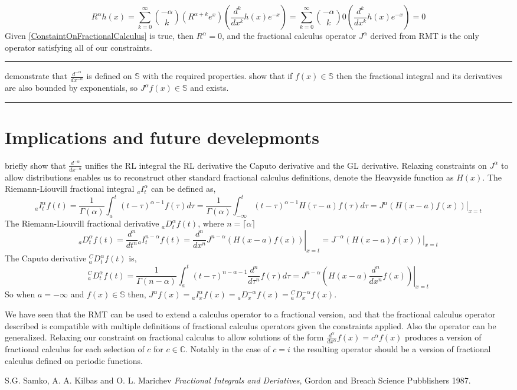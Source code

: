 \documentclass[%
 preprint,
 amsmath, amssymb, aps, pra, 10pt
]{revtex4-2}
\begin{document}
\[R^\alpha h(x) = \sum_{k=0}^\infty \binom{-\alpha}{k}\left( R^{\alpha + k}e^x \right)\left( \frac{d^k}{dx^k} h(x)e^{-x}\right) = \sum_{k=0}^\infty \binom{-\alpha}{k} 0 \left( \frac{d^k}{dx^k} h(x)e^{-x}\right) = 0\]
Given \eqref{ConstaintOnFractionalCalculus} is true, then $R^\alpha = 0$, and the fractional calculus operator $J^\alpha$ derived from RMT is the only operator satisfying all of our constraints.

\noindent\rule{\textwidth}{1pt}
demonstrate that $\frac{d^{-\alpha}}{dx^{-\alpha}}$ is defined on $\mathbb{S}$ with the required properties. show that if $f(x) \in \mathbb{S}$ then the fractional integral and its derivatives are also bounded by exponentials, so $J^\alpha f(x) \in \mathbb{S}$ and exists.

\noindent\rule{\textwidth}{1pt}

\section{Implications and future develepmonts}
briefly show that $\frac{d^{-\alpha}}{dx^{-\alpha}}$ unifies the RL integral the RL derivative the Caputo derivative and the GL derivative. Relaxing constraints on $J^\alpha$ to allow distributions enables us to reconstruct other standard fractional calculus definitions, denote the Heavyside function as $H(x)$. The Riemann-Liouvill fractional integral ${}_aI_t^\alpha$ can be defined as,
\[{}_aI_t^\alpha f(t) = \frac{1}{\Gamma(\alpha)}\int_a^t (t - \tau)^{\alpha - 1}f(\tau)d\tau = \frac{1}{\Gamma(\alpha)}\int_{-\infty}^t (t - \tau)^{\alpha - 1}H(\tau - a)f(\tau)d\tau = \left. J^\alpha \left(H(x - a)f(x)\right)\right|_{x = t}\]
The Riemann-Liouvill fractional derivative ${}_aD_t^\alpha f(t)$, where $n = \lceil \alpha \rceil$
\[{}_aD_t^\alpha f(t) = \frac{d^n}{dt^n} {}_aI_t^{n - \alpha} f(t) = \left. \frac{d^n}{dx^n} J^{n - \alpha} \left(H(x - a)f(x)\right)\right|_{x = t} = \left. J^{-\alpha} \left(H(x - a)f(x)\right)\right|_{x = t}\]
The Caputo derivative ${}_a^C D_t^\alpha f(t)$ is,
\[{}_a^C D_t^\alpha f(t) = \frac{1}{\Gamma(n - \alpha)} \int_a^t (t - \tau)^{n - \alpha - 1}\frac{d^n}{d\tau^n}f(\tau)d\tau = \left. J^{n - \alpha} \left(H(x - a)\frac{d^n}{dx^n}f(x)\right)\right|_{x = t} \]
So when $a = -\infty$ and $f(x) \in \mathbb{S}$ then, $J^\alpha f(x) = {}_{a}I_x^\alpha f(x) = {}_{a}D_x^{-\alpha} f(x) = {}_{a}^C D_x^{-\alpha} f(x)$.

We have seen that the RMT can be used to extend a calculus operator to a fractional version, and that the fractional calculus operator described is compatible with multiple definitions of fractional calculus operators given the constraints applied. Also the operator can be generalized. Relaxing our constraint on fractional calculus to allow solutions of the form $\frac{d^\alpha}{dx^\alpha}f(x) = c^\alpha f(x)$ produces a version of fractional calculus for each selection of $c$ for $c\in \mathbb{C}$. Notably in the case of $c = i$ the resulting operator should be a version of fractional calculus defined on periodic functions.

\begin{thebibliography}{1}
  S.G. Samko, A. A. Kilbas and O. L. Marichev
  \textit{Fractional Integrals and Deriatives},
  Gordon and Breach Science Pubblishers
  1987.
\end{thebibliography}
\end{document}
